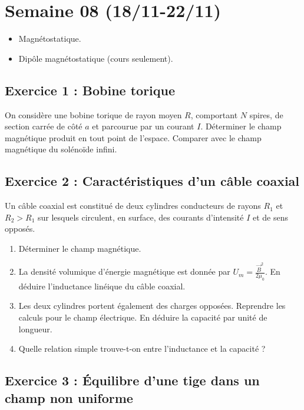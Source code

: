 \section{Semaine 08 (18/11-22/11) }

\begin{itemize}
	\item Magnétostatique.
	\item Dipôle magnétostatique (cours seulement).
\end{itemize}

\subsection{Exercice 1 : Bobine torique}

On considère une bobine torique de rayon moyen $R$, comportant $N$ spires, de section carrée de côté $a$ et parcourue par un courant $I$. Déterminer le champ magnétique produit en tout point de l'espace. Comparer avec le champ magnétique du solénoïde infini.

\subsection{Exercice 2 : Caractéristiques d'un câble coaxial}

Un câble coaxial est constitué de deux cylindres conducteurs de rayons $R_1$ et $R_2 > R_1$ sur lesquels circulent, en surface, des courants d'intensité $I$ et de sens opposés.

\begin{enumerate}
	\item Déterminer le champ magnétique.
	\item La densité volumique d'énergie magnétique est donnée par $U_m = \frac{\vec{B}^2}{2 \mu_0}$. En déduire l'inductance linéique du câble coaxial.
	\item Les deux cylindres portent également des charges opposées. Reprendre les calculs pour le champ électrique. En déduire la capacité par unité de longueur.
	\item Quelle relation simple trouve-t-on entre l'inductance et la capacité ?
\end{enumerate}

\subsection{Exercice 3 : Équilibre d'une tige dans un champ non uniforme}

